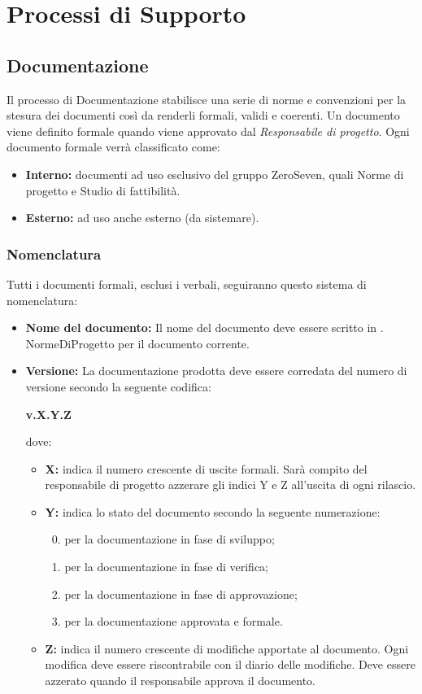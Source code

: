 \section{Processi di Supporto}
\subsection{Documentazione}
Il processo di Documentazione stabilisce una serie di norme e convenzioni per la stesura dei documenti così da renderli formali, validi e coerenti.
Un documento viene definito formale quando viene approvato dal \textit{Responsabile di progetto}.
Ogni documento formale verrà classificato come:
\begin{itemize}
	\item \textbf{Interno:} documenti ad uso esclusivo del gruppo ZeroSeven, quali Norme di progetto e Studio di fattibilità.  
	\item \textbf{Esterno:} ad uso anche esterno (da sistemare). 
	
\end{itemize}

\subsubsection{Nomenclatura}
Tutti i documenti formali, esclusi i verbali, seguiranno questo sistema di nomenclatura:
\begin{itemize}
	\item \textbf{Nome del documento:} Il nome del documento deve essere scritto in .
	NormeDiProgetto per il documento corrente. 
	\item \textbf{Versione:} La documentazione prodotta deve essere corredata del numero di versione secondo la seguente codifica:
	
	\textbf{v.X.Y.Z}
	
	dove:
	\begin{itemize}
		\item \textbf{X:} indica il numero crescente di uscite formali. Sarà compito del responsabile di progetto azzerare gli indici Y e Z all'uscita di ogni rilascio.
		\item \textbf{Y:} indica lo stato del documento secondo la seguente numerazione:
		\begin{enumerate}
			\setcounter{enumi}{-1}
			\item per la documentazione in fase di sviluppo;
			\item per la documentazione in fase di verifica;
			\item per la documentazione in fase di approvazione;
			\item per la documentazione approvata e formale.
		\end{enumerate}
		\item \textbf{Z:} indica il numero crescente di modifiche apportate al documento. Ogni modifica deve essere riscontrabile con il diario delle modifiche. Deve essere azzerato quando il responsabile approva il documento. 	
	\end{itemize}
\end{itemize}

